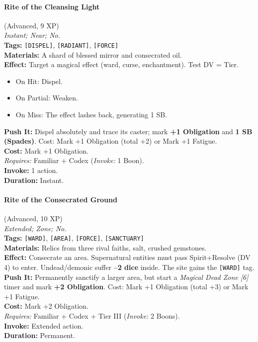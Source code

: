 \paragraph{Rite of the Cleansing Light} (Advanced, 9 XP) \hfill \\
\emph{Instant; Near; No.} \\
\textbf{Tags:} \texttt{[DISPEL]}, \texttt{[RADIANT]}, \texttt{[FORCE]} \\
\textbf{Materials:} A shard of blessed mirror and consecrated oil. \\
\textbf{Effect:} Target a magical effect (ward, curse, enchantment). Test DV = Tier.
\begin{itemize}
  \item On Hit: Dispel.
  \item On Partial: Weaken.
  \item On Miss: The effect lashes back, generating 1 SB.
\end{itemize}
\textbf{Push It:} Dispel absolutely and trace its caster; mark \textbf{+1 Obligation} and \textbf{1 SB (Spades)}. Cost: Mark +1 Obligation (total +2) or Mark +1 Fatigue. \\
\textbf{Cost:} Mark +1 Obligation. \\
\textit{Requires:} Familiar + Codex (\textit{Invoke:} 1 Boon). \\
\textbf{Invoke:} 1 action. \\
\textbf{Duration:} Instant.

\paragraph{Rite of the Consecrated Ground} (Advanced, 10 XP) \hfill \\
\emph{Extended; Zone; No.} \\
\textbf{Tags:} \texttt{[WARD]}, \texttt{[AREA]}, \texttt{[FORCE]}, \texttt{[SANCTUARY]} \\
\textbf{Materials:} Relics from three rival faiths, salt, crushed gemstones. \\
\textbf{Effect:} Consecrate an area. Supernatural entities must pass Spirit+Resolve (DV 4) to enter. Undead/demonic suffer \textbf{--2 dice} inside. The site gains the \texttt{[WARD]} tag. \\
\textbf{Push It:} Permanently sanctify a larger area, but start a \textit{Magical Dead Zone [6]} timer and mark \textbf{+2 Obligation}. Cost: Mark +1 Obligation (total +3) or Mark +1 Fatigue. \\
\textbf{Cost:} Mark +2 Obligation. \\
\textit{Requires:} Familiar + Codex + Tier III (\textit{Invoke:} 2 Boons). \\
\textbf{Invoke:} Extended action. \\
\textbf{Duration:} Permanent.


